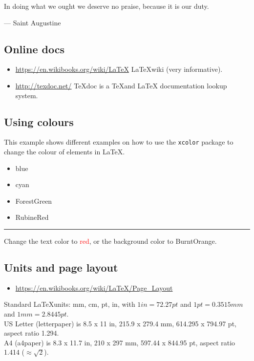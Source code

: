 \documentclass[letterpaper,dvipsnames]{article}
\begin{document}
\epigraph
{In doing what we ought we deserve no praise, because it is our duty.}
{--- \textup{Saint Augustine}}

\subsection{Online docs}
\begin{itemize}
    \item \url{https://en.wikibooks.org/wiki/LaTeX} 
          \LaTeX wiki (very informative).
    \item \url{http://texdoc.net/} TeXdoc is a \TeX and \LaTeX
          documentation lookup system.
\end{itemize}

\subsection{Using colours}
 
This example shows different examples on how to use the \texttt{xcolor} package 
to change the colour of elements in \LaTeX.
 
\begin{itemize}
\color{blue}
    \item blue
\color{cyan}
    \item cyan
\color{ForestGreen}
    \item ForestGreen
\color{RubineRed}
    \item RubineRed
\end{itemize}
 
\begin{flushleft} \color{red} \rule{\linewidth}{1pt} \end{flushleft}

Change the text color to \textcolor{red}{red}, or the background color to 
\colorbox{BurntOrange}{BurntOrange}.

\subsection{Units and page layout}
\begin{itemize}
    \item \url{https://en.wikibooks.org/wiki/LaTeX/Page_Layout}
\end{itemize}
Standard \LaTeX units: mm, cm, pt, in, with $1in = 72.27pt$ and 
$1pt = 0.3515mm$ and $1mm = 2.8445pt$. \\
US Letter (letterpaper) is 8.5 x 11 in, 215.9 x 279.4 mm, 
614.295 x 794.97 pt, aspect ratio 1.294. \\
A4 (a4paper) is 8.3 x 11.7 in, 210 x 297 mm, 597.44 x 844.95 pt, aspect ratio 1.414 
($\approx\sqrt{2}$).
\end{document}
